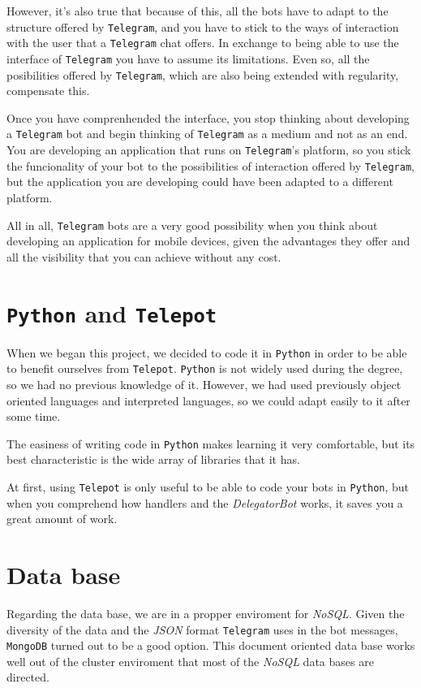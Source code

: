 \documentclass[oneside]{memoir}
\begin{document}
However, it's also true that because of this, all the bots have to adapt to the structure offered by \texttt{Telegram}, and you have to stick to the ways of interaction with the user that a \texttt{Telegram} chat offers. In exchange to being able to use the interface of \texttt{Telegram} you have to assume its limitations. Even so, all the posibilities offered by \texttt{Telegram}, which are also being extended with regularity, compensate this.

Once you have comprenhended the interface, you stop thinking about developing a \texttt{Telegram} bot and begin thinking of \texttt{Telegram} as a medium and not as an end. You are developing an application that runs on \texttt{Telegram}'s platform, so you stick the funcionality of your bot to the possibilities of interaction offered by \texttt{Telegram}, but the application you are developing could have been adapted to a different platform.

All in all, \texttt{Telegram} bots are a very good possibility when you think about developing an application for mobile devices, given the advantages they offer and all the visibility that you can achieve without any cost.

\section{\texttt{Python} and \texttt{Telepot}}
When we began this project, we decided to code it in \texttt{Python} in order to be able to benefit ourselves from \texttt{Telepot}. \texttt{Python} is not widely used during the degree, so we had no previous knowledge of it. However, we had used previously object oriented languages and interpreted languages, so we could adapt easily to it after some time.

The easiness of writing code in \texttt{Python} makes learning it very comfortable, but its best characteristic is the wide array of libraries that it has.

At first, using \texttt{Telepot} is only useful to be able to code your bots in \texttt{Python}, but when you comprehend how handlers and the \textit{DelegatorBot} works, it saves you a great amount of work.

\section{Data base}
Regarding the data base, we are in a propper enviroment for \textit{NoSQL}. Given the diversity of the data and the \textit{JSON} format \texttt{Telegram} uses in the bot messages, \texttt{MongoDB} turned out to be a good option. This document oriented data base works well out of the cluster enviroment that most of the \textit{NoSQL} data bases are directed.
\end{document}
